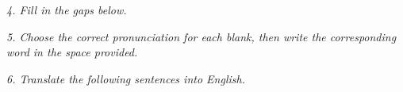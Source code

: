 \documentclass{exam}
\begin{document}
\noindent \textit{4. Fill in the gaps below.}

%
%
%
%
%
%
%
%
%
%
%
%
%
%
%
%
%
%
%
%

\noindent \textit{5. Choose the correct pronunciation for each blank, then write the corresponding word in the space provided.}

%
%
%
%
%
%
%
%
%
%
%
%
%
%
%
%
%
%
%
%




 \noindent \textit{6. Translate the following sentences into English.}

\begin{CJK*}{UTF8}{gbsn}
%
%
%
%
%
%
%
%
%
%
%
%
%
%
%
%
%
%
%
%
\end{CJK*}
\end{document}
